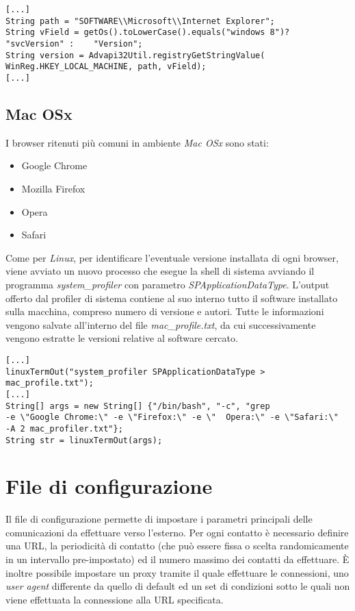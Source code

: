\vspace{0.5cm}
\begin{lstlisting}
[...]
String path = "SOFTWARE\\Microsoft\\Internet Explorer";
String vField = getOs().toLowerCase().equals("windows 8")? "svcVersion" : 	 "Version";
String version = Advapi32Util.registryGetStringValue(   
WinReg.HKEY_LOCAL_MACHINE, path, vField);
[...]
\end{lstlisting}

\subsection{Mac OSx}
I browser ritenuti pi\`{u} comuni in ambiente \textit{Mac OSx} sono stati:
\begin{itemize}
	\item Google Chrome
	\item Mozilla Firefox
	\item Opera
	\item Safari
\end{itemize}
Come per \textit{Linux}, per identificare l'eventuale versione installata di ogni browser, viene avviato un nuovo processo che esegue la shell di sistema avviando il programma \textit{system\_profiler} con parametro \textit{SPApplicationDataType}. L'output offerto dal profiler di sistema contiene al suo interno tutto il software installato sulla macchina, compreso numero di versione e autori. 
Tutte le informazioni vengono salvate all'interno del file \textit{mac\_profile.txt}, da cui successivamente vengono estratte le versioni relative al software cercato.

\vspace{0.5cm}
\begin{lstlisting}
[...]
linuxTermOut("system_profiler SPApplicationDataType > mac_profile.txt");
[...]
String[] args = new String[] {"/bin/bash", "-c", "grep 
-e \"Google Chrome:\" -e \"Firefox:\" -e \"  Opera:\" -e \"Safari:\" 
-A 2 mac_profiler.txt"};
String str = linuxTermOut(args);
\end{lstlisting}

\section{File di configurazione}
Il file di configurazione permette di impostare i parametri principali delle comunicazioni da effettuare verso l'esterno.
Per ogni contatto \`{e} necessario definire una URL, la periodicit\`{a} di contatto (che pu\`{o} essere fissa o scelta randomicamente in un intervallo pre-impostato) ed il numero massimo dei contatti da effettuare.
\`{E} inoltre possibile impostare un proxy tramite il quale effettuare le connessioni, uno \textit{user agent} differente da quello di default ed un set di condizioni sotto le quali non viene effettuata la connessione alla URL specificata.

